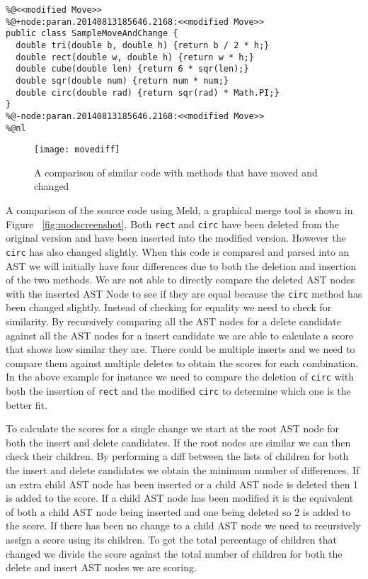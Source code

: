 \begin{lstlisting}
%@<<modified Move>>
%@+node:paran.20140813185646.2168:<<modified Move>>
public class SampleMoveAndChange {
  double tri(double b, double h) {return b / 2 * h;}
  double rect(double w, double h) {return w * h;}
  double cube(double len) {return 6 * sqr(len);}
  double sqr(double num) {return num * num;}
  double circ(double rad) {return sqr(rad) * Math.PI;}
}
%@-node:paran.20140813185646.2168:<<modified Move>>
%@nl
\end{lstlisting}


\begin{figure}[!t]
\begin{center}
 \texttt{[image: movediff]}
 \end{center}
\caption{A comparison of similar code with methods that have moved and changed}
 \label{fig:orig}
\end{figure}


A comparison of the source code using Meld, a graphical merge tool is shown in Figure ~\ref{fig:modscreenshot}. Both \lstinline{rect} and \lstinline{circ} have been deleted from the original version and have been inserted into the modified version.  However the \lstinline{circ} has also changed slightly. 
When this code is compared and parsed into an AST we will initially have four differences due to both the deletion and insertion of the two methods.    
We are not able to directly compare the deleted AST nodes with the inserted AST Node to see if they are equal because the \lstinline{circ} method has been changed slightly. 
Instead of checking for equality we need to check for similarity.
By recursively comparing all the AST nodes for a delete candidate against all the AST nodes for a insert candidate we are able to calculate a score that shows how similar they are. 
There could be multiple inserts and we need to compare them against multiple deletes to obtain the scores for each combination.
In the above example for instance we need to compare the deletion of \lstinline{circ} with both the insertion of \lstinline{rect} and the modified \lstinline{circ} to determine which one is the better fit.

To calculate the scores for a single change we start at the root AST node for both the insert and delete candidates.  If the root nodes are similar we can then check their children. By performing a diff between the lists of children for both the insert and delete candidates we obtain the minimum number of differences.  If an extra child AST node has been inserted or a child AST node is deleted then 1 is added to the score. If a child AST node has been modified it is the equivalent of both a child AST node being inserted and one being deleted so 2 is added to the score. If there has been no change to a child AST node we need to recursively assign a score using its children. To get the total percentage of children that changed we divide the score against the total number of children for both the delete and insert AST nodes we are scoring.

